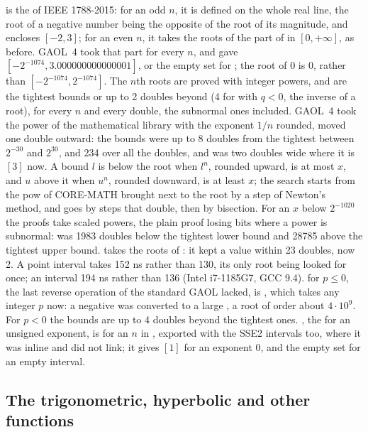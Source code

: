 \documentclass[12pt,a4paper,twoside,openright]{book}
\begin{document}
\medskip
{} is the  of IEEE 1788-2015: for an odd
$n$, it is defined on the whole real line, the root of a negative number
being the opposite of the root of its magnitude, and  encloses $[-2, 3]$; for an even $n$, it takes the roots of the part of
 in $[0, +\infty]$, as before.\newinvfive{} GAOL~4 took that part for
every $n$, and gave $[-2^{-1074}, 3.000000000000001]$, or the empty set for
; the root of 0 is 0, rather than
$[-2^{-1074}, 2^{-1074}]$. The $n$th roots are proved with integer powers,
and are the tightest bounds or up to 2 doubles beyond (4 for 
with $q < 0$, the inverse of a root), for every $n$ and every double, the
subnormal ones included. GAOL~4 took the power of the mathematical library
with the exponent $1/n$ rounded, moved one double outward: the bounds were up
to 8 doubles from the tightest between $2^{-30}$ and $2^{30}$, and 234 over
all the doubles, and  was two doubles wide where it
is $[3]$ now. A bound $l$ is below the root when $l^n$, rounded upward, is at
most $x$, and $u$ above it when $u^n$, rounded downward, is at least $x$; the
search starts from the pow of CORE-MATH brought next to the root by a step of
Newton's method, and goes by steps that double, then by bisection. For an
$x$ below $2^{-1020}$ the proofs take scaled powers, the plain proof losing
bits where a power is subnormal:  was 1983
doubles below the tightest lower bound and 28785 above the tightest upper
bound.  takes the roots of : it kept
a value within 23 doubles, now 2. A point interval takes 152 ns rather than
130, its only root being looked for once; an interval 194 ns rather than 136
(Intel i7-1185G7, GCC 9.4).  for $p \leq 0$, the last
reverse operation of the standard GAOL lacked, is , which takes any integer $p$ now: a negative  was converted to
a large , a root of order about $4 \cdot 10^9$. For
$p < 0$ the bounds are up to 4 doubles beyond the tightest ones.
, the  for an unsigned exponent, is  for an  $n$ in , exported with the SSE2
intervals too, where it was inline and did not link; it gives $[1]$ for an
exponent 0, and the empty set for an empty interval.

\subsection{The trigonometric, hyperbolic and other functions}
\label{sec:changes-functions}
%
\end{document}
